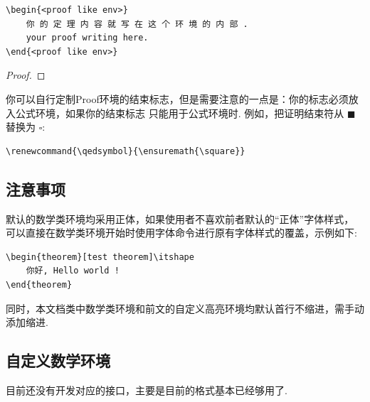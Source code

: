 \begin{verbatim}
\begin{<proof like env>}
    你 的 定 理 内 容 就 写 在 这 个 环 境 的 内 部 .
    your proof writing here.
\end{<proof like env>}
\end{verbatim}

\vspace*{4em}
\begin{proof}
    \boomen \par 
    \boomcn
\end{proof}

\begin{example}
    \boomen \par 
    \boomcn
\end{example}

你可以自行定制Proof环境的结束标志，但是需要注意的一点是：你的标志必须放入公式环境，如果你的结束标志
只能用于公式环境时. 例如，把证明结束符从 \(\blacksquare\) 替换为 $\square$:
\begin{verbatim}
\renewcommand{\qedsymbol}{\ensuremath{\square}}
\end{verbatim}


\subsection{注意事项}
默认的数学类环境均采用正体\cmd{\upshape}，如果使用者不喜欢前者默认的``正体''字体样式，
可以直接在数学类环境开始时使用字体命令\cmd{\itshape}进行原有字体样式的覆盖，示例如下:

\begin{verbatim}
\begin{theorem}[test theorem]\itshape
    你好, Hello world !
\end{theorem}
\end{verbatim}

\begin{remark}\itshape
    \boomen \par 
    \boomcn
\end{remark}

同时，本文档类中数学类环境和前文的自定义高亮环境\cmd{\zlatexFramed}均默认首行不缩进，需手动添加缩进.

\subsection{自定义数学环境}
目前还没有开发对应的接口，主要是目前的格式基本已经够用了.


